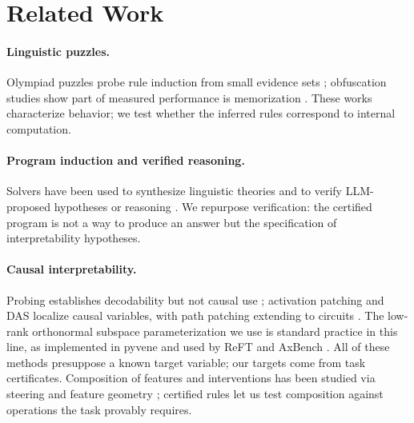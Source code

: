 \section{Related Work}
\label{sec:related}

\paragraph{Linguistic puzzles.} Olympiad puzzles probe rule induction from
small evidence sets \citep{lingoly,modeling,unveiling,majmudar2025};
obfuscation studies show part of measured performance is memorization
\citep{lingolytoo}. These works characterize behavior; we test whether the
inferred rules correspond to internal computation.

\paragraph{Program induction and verified reasoning.} Solvers have been
used to synthesize linguistic theories \citep{ellis2022} and to verify
LLM-proposed hypotheses or reasoning
\citep{wang2023hypothesis,parab2025,lyu2023,pan2023,olausson2023,ye2023}.
We repurpose verification: the certified program is not a way to produce an
answer but the specification of interpretability hypotheses.

\paragraph{Causal interpretability.} Probing establishes decodability but
not causal use \citep{conneau2018,hewitt2019,elazar2021,belinkov2022};
activation patching \citep{vig2020,meng2022,zhang2024} and DAS
\citep{geiger2021,geiger2024das,wu2023boundless,geiger2025} localize causal
variables, with path patching extending to circuits
\citep{wang2022ioi,goldowskydill2023,conmy2023}. The low-rank orthonormal
subspace parameterization we use is standard practice in this line, as
implemented in pyvene \citep{wu2024pyvene} and used by ReFT
\citep{wu2024reft} and AxBench \citep{wu2025axbench}. All of these methods
presuppose a known target variable; our targets come from task
certificates. Composition of features and interventions has been studied
via steering and feature geometry
\citep{turner2023,rimsky2024,merullo2024,bricken2023,huben2024,park2024};
certified rules let us test composition against operations the task
provably requires.
